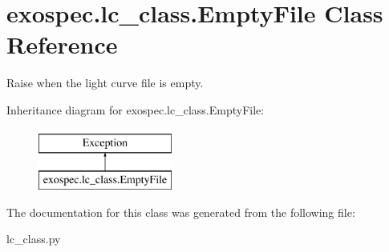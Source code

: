 \hypertarget{classexospec_1_1lc__class_1_1_empty_file}{}\section{exospec.\+lc\+\_\+class.\+Empty\+File Class Reference}
\label{classexospec_1_1lc__class_1_1_empty_file}


Raise when the light curve file is empty.  


Inheritance diagram for exospec.\+lc\+\_\+class.\+Empty\+File\+:\begin{figure}[H]
\begin{center}
\leavevmode
\includegraphics[height=2.000000cm]{classexospec_1_1lc__class_1_1_empty_file}
\end{center}
\end{figure}


The documentation for this class was generated from the following file\+:\begin{DoxyCompactItemize}
\item 
lc\+\_\+class.\+py\end{DoxyCompactItemize}
